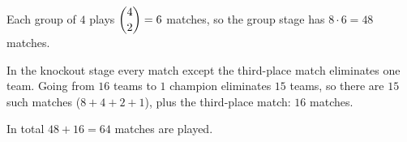 Each group of $4$ plays $\dbinom42=6$ matches, so the group stage has $8\cdot6=48$ matches.

In the knockout stage every match except the third-place match eliminates one team. Going from $16$ teams to $1$ champion eliminates $15$ teams, so there are $15$ such matches ($8+4+2+1$), plus the third-place match: $16$ matches.

In total $48+16=\boxed{64}$ matches are played.

